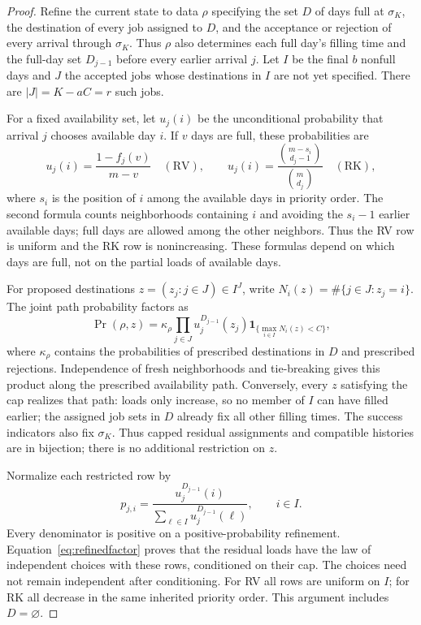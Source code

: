 \documentclass[11pt]{article}
\newcommand{\RV}{\mathrm{RV}}
\newcommand{\RK}{\mathrm{RK}}
\begin{document}
\begin{proof}
Refine the current state to data $\rho$ specifying the set $D$ of
days full at $\sigma_K$, the
destination of every job assigned to $D$, and the acceptance or
rejection of every arrival through $\sigma_K$. Thus $\rho$ also
determines each full day's filling time and the full-day set
$D_{j-1}$ before every earlier arrival $j$. Let $I$ be the final
$b$ nonfull days and $J$ the accepted jobs whose destinations in
$I$ are not yet specified. There are $|J|=K-aC=r$ such jobs.

For a fixed availability set, let $u_j(i)$ be the unconditional
probability that arrival $j$ chooses available day $i$. If $v$ days
are full, these probabilities are
\[
 u_j(i)=\frac{1-f_j(v)}{m-v}\quad(\RV),\qquad
 u_j(i)=\frac{\binom{m-s_i}{d_j-1}}{\binom m{d_j}}
       \quad(\RK),
\]
where $s_i$ is the position of $i$ among the available days in
priority order. The second formula counts neighborhoods containing
$i$ and avoiding the $s_i-1$ earlier available days; full days
are allowed among the other neighbors. Thus the RV row is uniform
and the RK row is nonincreasing. These formulas depend on which
days are full, not on the partial loads of available days.

For proposed destinations $z=(z_j:j\in J)\in I^J$, write
$N_i(z)=\#\{j\in J:z_j=i\}$. The joint path probability factors as
\begin{equation}\label{eq:refinedfactor}
 \Pr(\rho,z)=\kappa_\rho
      \prod_{j\in J}u_j^{D_{j-1}}(z_j)
      \mathbf1_{\{\max_{i\in I}N_i(z)<C\}},
\end{equation}
where $\kappa_\rho$ contains the probabilities of prescribed
destinations in $D$ and prescribed rejections. Independence of fresh
neighborhoods and tie-breaking gives this product along the prescribed
availability path. Conversely, every $z$ satisfying the cap realizes
that path: loads only increase, so no member of $I$ can have filled
earlier; the assigned job sets in $D$ already fix all other filling
times. The success indicators also fix $\sigma_K$. Thus capped residual
assignments and compatible histories are in bijection; there is no
additional restriction on $z$.

Normalize each restricted row by
\[
 p_{j,i}=\frac{u_j^{D_{j-1}}(i)}
                  {\sum_{\ell\in I}u_j^{D_{j-1}}(\ell)},
 \qquad i\in I.
\]
Every denominator is positive on a positive-probability refinement.
Equation~\eqref{eq:refinedfactor} proves that the residual loads
have the law of independent choices with these rows, conditioned on
their cap. The choices need not remain independent after conditioning.
For RV all rows are uniform on $I$; for RK all decrease in the
same inherited priority order. This argument includes $D=\varnothing$.


\end{proof}
\end{document}
